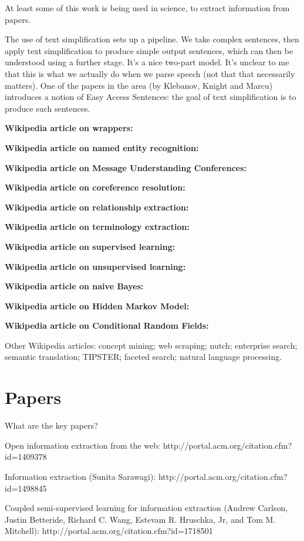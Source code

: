 At least some of this work is being used in science, to extract
information from papers.

The use of text simplification sets up a pipeline.  We take complex
sentences, then apply text simplification to produce simple output
sentences, which can then be understood using a further stage.  It's a
nice two-part model.  It's unclear to me that this is what we actually
do when we parse speech (not that that necessarily matters).  One of
the papers in the area (by Klebanov, Knight and Marcu) introduces a
notion of Easy Access Sentences: the goal of text simplification is to
produce such sentences.

\textbf{Wikipedia article on wrappers:}


\textbf{Wikipedia article on named entity recognition:}

\textbf{Wikipedia article on Message Understanding Conferences:}

\textbf{Wikipedia article on coreference resolution:}

\textbf{Wikipedia article on relationship extraction:}

\textbf{Wikipedia article on terminology extraction:}

\textbf{Wikipedia article on supervised learning:}

\textbf{Wikipedia article on unsupervised learning:}

\textbf{Wikipedia article on naive Bayes:}

\textbf{Wikipedia article on Hidden Markov Model:}

\textbf{Wikipedia article on Conditional Random Fields:}

Other Wikipedia articles: concept mining; web scraping; nutch;
enterprise search; semantic translation; TIPSTER; faceted search;
natural language processing.

\section{Papers}

What are the key papers?

Open information extraction from the web:
http://portal.acm.org/citation.cfm?id=1409378

Information extraction (Sunita Sarawagi):
http://portal.acm.org/citation.cfm?id=1498845

Coupled semi-supervised learning for information extraction (Andrew
Carlson, Justin Betteride, Richard C. Wang, Estevam R. Hruschka, Jr,
and Tom M. Mitchell): http://portal.acm.org/citation.cfm?id=1718501

